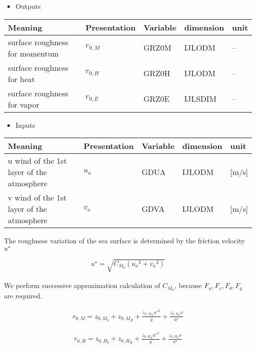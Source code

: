 \begin{itemize}
\tightlist
\item
  Outputs
\end{itemize}

\setlength\LTleft{0pt}\setlength\LTright{0pt}\begin{longtable}[]{@{}lllll@{}}
\toprule\relax
Meaning & Presentation & Variable & dimension & unit \\
\midrule\relax
\endhead
surface roughness for momentum & \(r_{0,M}\) & GRZ0M & IJLODM & -- \\
surface roughness for heat & \(r_{0,H}\) & GRZ0H & IJLODM & -- \\
surface roughness for vapor & \(r_{0,E}\) & GRZ0E & IJLSDIM & -- \\
\bottomrule
\end{longtable}

\begin{itemize}
\tightlist
\item
  Inputs
\end{itemize}

\setlength\LTleft{0pt}\setlength\LTright{0pt}\begin{longtable}[]{@{}lllll@{}}
\toprule\relax
Meaning & Presentation & Variable & dimension & unit \\
\midrule\relax
\endhead
u wind of the 1st layer of the atmosphere & \(u_a\) & GDUA & IJLODM &
{[}m/s{]} \\
v wind of the 1st layer of the atmosphere & \(v_a\) & GDVA & IJLODM &
{[}m/s{]} \\
\bottomrule
\end{longtable}

The roughness variation of the sea surface is determined by the friction
velocity \(u^\star\)

\begin{eqnarray}
u^{\star} = \sqrt{C_{M_0} ({u_a}^2  +{v_a}^2)}
\end{eqnarray}

We perform successive approximation calculation of \({C_{M_0}}\),
because \(F_u,F_v,F_\theta,F_q\) are required.

\begin{eqnarray}
    r_{0,M} = z_{0,M_0} + z_{0,M_R} + \frac{z_{0,M_R} {u^\star }^2 }{g} + \frac{z_{0,M_S}\nu }{u^\star}
\end{eqnarray}

\begin{eqnarray}
    r_{0,H} = z_{0,H_0} + z_{0,H_R} + \frac{z_{0,H_R} {u^\star }^2 }{g} + \frac{z_{0,H_S}\nu }{u^\star}
\end{eqnarray}


